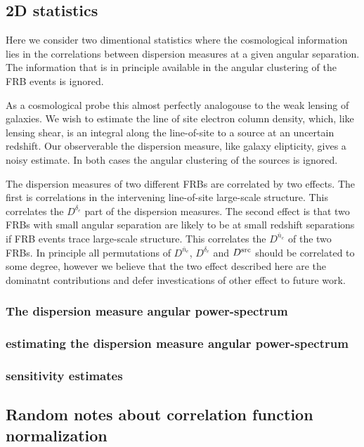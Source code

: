 \documentclass[onecolumn,prd,noshowpacs,nofootinbib,amsmath,amssymb]{revtex4}
\begin{document}
\subsection{2D statistics}

Here we consider two dimentional statistics where the cosmological information
lies in the correlations between dispersion measures at a given angular
separation.  The information that is in principle available in the angular
clustering of the FRB events is ignored.

As a cosmological probe this almost perfectly analogouse to the weak lensing 
of galaxies.
We wish to estimate the line of site electron column density,
which, like lensing shear, is an integral along the line-of-site to a source at an
uncertain redshift. Our observerable the dispersion measure, like galaxy
elipticity, gives a noisy estimate.  In both cases the angular clustering of
the sources is ignored.

The dispersion measures of two different FRBs are correlated by two effects.
The first is correlations in the intervening line-of-site large-scale
structure.  This correlates the $D^{\delta_e}$ part of the dispersion measures.
The second effect is that two FRBs with small angular separation are likely to
be at small redshift separations if FRB events trace large-scale structure.
This correlates the $D^{\bar{n}_e}$ of the two FRBs.  In principle all
permutations of $D^{\bar{n}_e}$, $D^{\delta_e}$ and $D^{\rm src}$ should be
correlated to some degree, however we believe that the two effect described
here are the dominatnt contributions and defer investications of other effect
to future work.

\subsubsection{The dispersion measure angular power-spectrum}

\subsubsection{estimating the dispersion measure angular power-spectrum}

\subsubsection{sensitivity estimates}


\subsection{Random notes about correlation function normalization}
\end{document}
